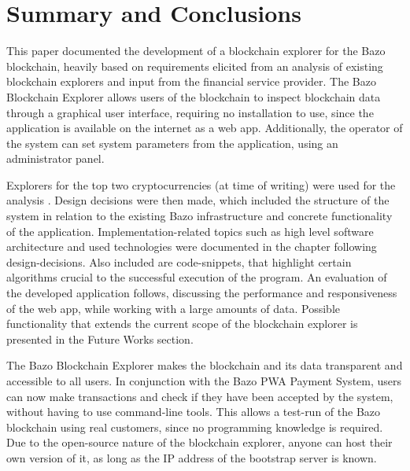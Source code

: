 \chapter{Summary and Conclusions}

This paper documented the development of a blockchain explorer for the Bazo blockchain, heavily based on requirements elicited from an analysis of existing blockchain explorers and input from the financial service provider. The Bazo Blockchain Explorer allows users of the blockchain to inspect blockchain data through a graphical user interface, requiring no installation to use, since the application is available on the internet as a web app. Additionally, the operator of the system can set system parameters from the application, using an administrator panel. 

Explorers for the top two cryptocurrencies (at time of writing) were used for the analysis \cite{coinmarketcap}. Design decisions were then made, which included the structure of the system in relation to the existing Bazo infrastructure and concrete functionality of the application. Implementation-related topics such as high level software architecture and used technologies were documented in the chapter following design-decisions. Also included are code-snippets, that highlight certain algorithms crucial to the successful execution of the program. An evaluation of the developed application follows, discussing the performance and responsiveness of the web app, while working with a large amounts of data. Possible functionality that extends the current scope of the blockchain explorer is presented in the Future Works section.

The Bazo Blockchain Explorer makes the blockchain and its data transparent and accessible to all users. In conjunction with the Bazo PWA Payment System, users can now make transactions and check if they have been accepted by the system, without having to use command-line tools. This allows a test-run of the Bazo blockchain using real customers, since no programming knowledge is required. Due to the open-source nature of the blockchain explorer, anyone can host their own version of it, as long as the IP address of the bootstrap server is known.
